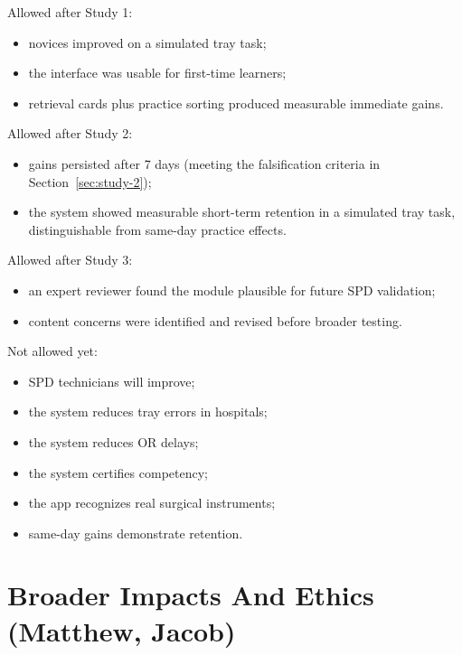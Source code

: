 \documentclass[10pt,a4paper]{article}
\begin{document}
Allowed after Study 1:
\begin{itemize}
  \item novices improved on a simulated tray task;
  \item the interface was usable for first-time learners;
  \item retrieval cards plus practice sorting produced measurable immediate gains.
\end{itemize}
Allowed after Study 2:
\begin{itemize}
  \item gains persisted after 7 days (meeting the falsification criteria in Section~\ref{sec:study-2});
  \item the system showed measurable short-term retention in a simulated tray task, distinguishable from same-day practice effects.
\end{itemize}
Allowed after Study 3:
\begin{itemize}
  \item an expert reviewer found the module plausible for future SPD validation;
  \item content concerns were identified and revised before broader testing.
\end{itemize}
Not allowed yet:
\begin{itemize}
  \item SPD technicians will improve;
  \item the system reduces tray errors in hospitals;
  \item the system reduces OR delays;
  \item the system certifies competency;
  \item the app recognizes real surgical instruments;
  \item same-day gains demonstrate retention.
\end{itemize}



\section{Broader Impacts And Ethics \hfill {\normalfont\small (Matthew, Jacob)}}
\label{sec:broader-impacts-and-ethics}
\end{document}
